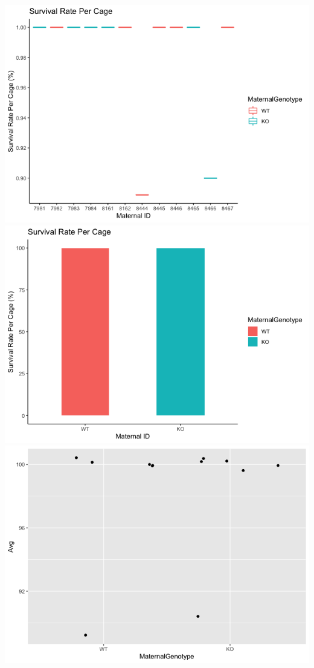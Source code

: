 \documentclass[]{article}
\begin{document}
\includegraphics{figures/atsc-fertilitypercage-bargraph-1.png}
\includegraphics{figures/atsc-fertilitypercage-bargraph-2.png}
\includegraphics{figures/atsc-fertilitypercage-bargraph-3.png}
\end{document}
